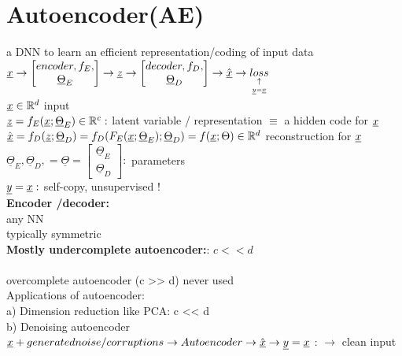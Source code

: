 \section{Autoencoder(AE)}
a DNN to learn an efficient representation/coding of input data\\
$ {\underline x} \rightarrow  \left[\begin{matrix}
encoder, f_E , \\
\underline{\Theta}_E
\end{matrix} \right] \rightarrow {\underline z} \rightarrow \left[ \begin{matrix}
decoder, f_D ,\\
 \underline{\Theta}_D
\end{matrix}\right] \rightarrow \hat{{\underline x}} \rightarrow \underset{\underset{{\underline y} = {\underline x}}{\uparrow} }{loss}$\\
$  {\underline x} \in \mathbb R ^d  $ input \\
$  {\underline z} = f_E ({\underline x} ; \underline{\Theta}_E) \in \mathbb R^c : $ latent variable / representation $  \equiv  $ a hidden code for $ {\underline x}  $\\
 $ \hat{{\underline x}} = f_D ({\underline z} ; \underline{\Theta}_D )= f_D (F_E ({\underline x} ; \underline{\Theta}_E ) ; \underline{\Theta}_D )  = f({\underline x} ; \Theta ) \in \mathbb R ^d  $ reconstruction for $  {\underline x}  $\\
 $  \underline{\Theta} _E ,   \underline{\Theta} _D , = \underline{\Theta} = \left[ \begin{matrix}
 \underline{\Theta} _E \\
 \underline{\Theta} _D 
 \end{matrix}  \right] : $ parameters \\
 $  {\underline y} = {\underline x}:  $ self-copy, unsupervised ! \\
\textbf{ Encoder /decoder:}\\
\textbullet any NN \\
\textbullet typically symmetric \\
\textbf{Mostly undercomplete autoencoder:}: $ c << d  $\\
 \\
overcomplete autoencoder (c >> d) never used \\
Applications of autoencoder:\\
\textbullet a) Dimension reduction like PCA: c << d \\
\textbullet b) Denoising autoencoder \\
$ {\underline x} + generated noise / corruptions \rightarrow Autoencoder \rightarrow \hat{{\underline x}}\rightarrow {\underline y} = {\underline x}  $ : $ \rightarrow $ clean input \\
